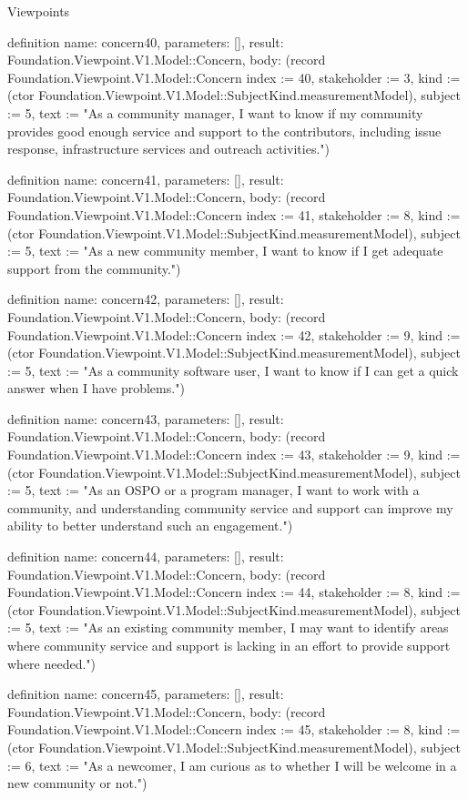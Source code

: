 \begin{lexlean}{Viewpoints}
\begin{semanticmodule}
definition{
  name: concern40,
  parameters: [],
  result: Foundation.Viewpoint.V1.Model::Concern,
  body: (record Foundation.Viewpoint.V1.Model::Concern {index := 40, stakeholder := 3, kind := (ctor Foundation.Viewpoint.V1.Model::SubjectKind.measurementModel), subject := 5, text := "As a community manager, I want to know if my community provides good enough service and support to the contributors, including issue response, infrastructure services and outreach activities."})
}

definition{
  name: concern41,
  parameters: [],
  result: Foundation.Viewpoint.V1.Model::Concern,
  body: (record Foundation.Viewpoint.V1.Model::Concern {index := 41, stakeholder := 8, kind := (ctor Foundation.Viewpoint.V1.Model::SubjectKind.measurementModel), subject := 5, text := "As a new community member, I want to know if I get adequate support from the community."})
}

definition{
  name: concern42,
  parameters: [],
  result: Foundation.Viewpoint.V1.Model::Concern,
  body: (record Foundation.Viewpoint.V1.Model::Concern {index := 42, stakeholder := 9, kind := (ctor Foundation.Viewpoint.V1.Model::SubjectKind.measurementModel), subject := 5, text := "As a community software user, I want to know if I can get a quick answer when I have problems."})
}

definition{
  name: concern43,
  parameters: [],
  result: Foundation.Viewpoint.V1.Model::Concern,
  body: (record Foundation.Viewpoint.V1.Model::Concern {index := 43, stakeholder := 9, kind := (ctor Foundation.Viewpoint.V1.Model::SubjectKind.measurementModel), subject := 5, text := "As an OSPO or a program manager, I want to work with a community, and understanding community service and support can improve my ability to better understand such an engagement."})
}

definition{
  name: concern44,
  parameters: [],
  result: Foundation.Viewpoint.V1.Model::Concern,
  body: (record Foundation.Viewpoint.V1.Model::Concern {index := 44, stakeholder := 8, kind := (ctor Foundation.Viewpoint.V1.Model::SubjectKind.measurementModel), subject := 5, text := "As an existing community member, I may want to identify areas where community service and support is lacking in an effort to provide support where needed."})
}

definition{
  name: concern45,
  parameters: [],
  result: Foundation.Viewpoint.V1.Model::Concern,
  body: (record Foundation.Viewpoint.V1.Model::Concern {index := 45, stakeholder := 8, kind := (ctor Foundation.Viewpoint.V1.Model::SubjectKind.measurementModel), subject := 6, text := "As a newcomer, I am curious as to whether I will be welcome in a new community or not."})
}


\end{semanticmodule}
\end{lexlean}
